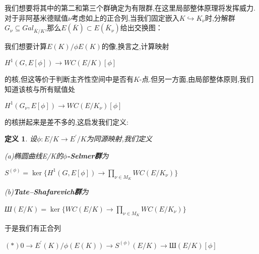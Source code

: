 \documentclass[11pt]{ctexart}
\newtheorem{defi}{定义}[section]
\begin{document}
我们想要将其中的第二和第三个群确定为有限群,在这里局部整体原理将发挥威力.对于非阿基米德赋值$\nu$考虑如上的正合列,当我们固定嵌入$K \hookrightarrow K_{\nu}$时,分解群$G_{\nu}\subseteq Gal_{\overline{K}/K}$,那么$E(\overline{K})\subset E(\overline{K}_{\nu})$给出交换图：
\begin{center}
      
\end{center}
我们想要计算$E(K)/\phi E(K)$的像,换言之,计算映射
\begin{center}
    $H^1(G,E[\phi]) \rightarrow WC(E/K)[\phi]$
\end{center}
的核,但这等价于判断主齐性空间中是否有$K$-点.但另一方面,由局部整体原则,我们知道该核与所有赋值处
\begin{center}
    $H^1(G_{\nu},E[\phi]) \rightarrow WC(E/K_{\nu})[\phi]$
\end{center}
的核拼起来是差不多的,这启发我们定义:
\begin{defi}设$\phi:E/K \rightarrow E^{\prime}/K$为同源映射,我们定义

    (a)椭圆曲线E/K的\textbf{$\phi$-Selmer群}为
\begin{center}
    $S^{(\phi)}=\ker\{H^1(G,E[\phi]) \rightarrow \prod\limits_{\nu \in M_K}WC(E/K_{\nu})\}$
\end{center}

    (b)\textbf{Tate--Shafarevich群}为
      \begin{center}
       \textup{Ш}$(E/K)=\ker\{WC(E/K)\rightarrow \prod\limits_{\nu \in M_K}WC(E/K_{\nu}) \}$
      \end{center}


\end{defi}
\noindent 于是我们有正合列
\begin{center}
    $(\ast )0\rightarrow E^{\prime}(K)/\phi(E(K))\rightarrow S^{(\phi)}(E/K)\rightarrow $Ш$(E/K)[\phi] $
\end{center}
\end{document}
